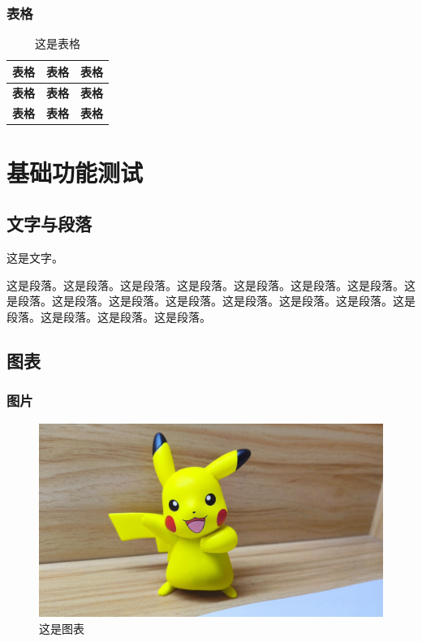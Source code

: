 \begin{ujnbody}
    \subsubsection{表格}

    \begin{table}[htbp]
        \centering
        \caption{这是表格}
        \begin{tabular}{|c|c|c|}
            \hline
            \multicolumn{1}{|c|}{\textbf{表格}} & \multicolumn{1}{c|}{\textbf{表格}} & \multicolumn{1}{c|}{\textbf{表格}} \\ \hline
            \multicolumn{1}{|c|}{\textbf{表格}} & \multicolumn{1}{c|}{\textbf{表格}} & \multicolumn{1}{c|}{\textbf{表格}} \\ \hline
            \multicolumn{1}{|c|}{\textbf{表格}} & \multicolumn{1}{c|}{\textbf{表格}} & \multicolumn{1}{c|}{\textbf{表格}} \\ \hline
        \end{tabular}
    \end{table}
    \section{基础功能测试}
    \subsection{文字与段落}
    这是文字。

    这是段落。这是段落。这是段落。这是段落。这是段落。这是段落。这是段落。这是段落。这是段落。这是段落。这是段落。这是段落。这是段落。这是段落。这是段落。这是段落。这是段落。这是段落。
    \subsection{图表}

    \subsubsection{图片}

    \begin{figure}[htbp]
        \centering
        \includegraphics[scale=0.1, ]{figures/pikachu.jpg}
        \caption{这是图表}
    \end{figure}


\end{ujnbody}

